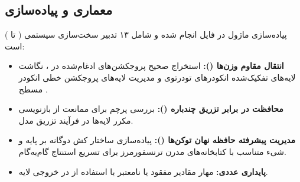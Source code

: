 \subsection{معماری و پیاده‌سازی}
پیاده‌سازی ماژول در فایل  انجام شده و شامل ۱۳ تدبیر سخت‌سازی سیستمی ( تا ) است:
\begin{itemize}
    \item \textbf{انتقال مقاوم وزن‌ها ():} استخراج صحیح پروجکشن‌های ادغام‌شده  در ، نگاشت لایه‌های تفکیک‌شده انکودرهای تودرتوی  و مدیریت لایه‌های پروجکشن خطی انکودر مسطح .
    \item \textbf{محافظت در برابر تزریق چندباره ():} بررسی پرچم  برای ممانعت از بازنویسی مکرر لایه‌ها در فرآیند تزریق مدل.
    \item \textbf{مدیریت پیشرفته حافظه نهان توکن‌ها ():} پیاده‌سازی ساختار کش دوگانه بر پایه  و شیء  متناسب با کتابخانه‌های مدرن ترنسفورمرز برای تسریع استنتاج گام‌به‌گام.
    \item \textbf{پایداری عددی:} مهار مقادیر مفقود یا نامعتبر با استفاده از  در خروجی لایه.
\end{itemize}
